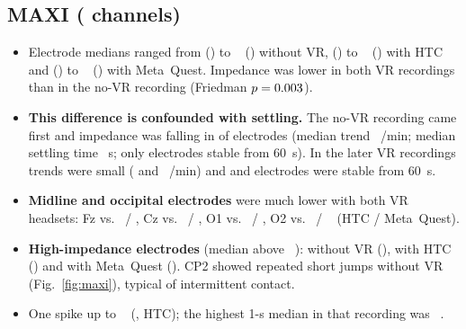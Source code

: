 \documentclass[11pt,a4paper]{article}
\begin{document}
\subsection{MAXI (\impMAXINChannels{} channels)}
\begin{itemize}
  \item Electrode medians ranged from \impMAXIMedMinNoVR{} (\impMAXIMedMinChNoVR) to
    \impMAXIMedMaxNoVR~\impUnit{} (\impMAXIMedMaxChNoVR) without VR,
    \impMAXIMedMinHTC{} (\impMAXIMedMinChHTC) to \impMAXIMedMaxHTC~\impUnit{}
    (\impMAXIMedMaxChHTC) with HTC and \impMAXIMedMinMetaQuest{}
    (\impMAXIMedMinChMetaQuest) to \impMAXIMedMaxMetaQuest~\impUnit{}
    (\impMAXIMedMaxChMetaQuest) with Meta~Quest. Impedance was lower in both VR
    recordings than in the no-VR recording (Friedman \(p = 0.003\)).
  \item \textbf{This difference is confounded with settling.} The no-VR
    recording came first and impedance was falling in
    \impMAXINDecreaseNoVR{} of \impMAXINChannels{} electrodes (median trend
    \impMAXISlopeNoVRWfive~\impUnit/min; median settling time
    \impMAXISettleMedNoVR~s; only \impMAXINSettledSixtyNoVR{} electrodes stable
    from 60~s). In the later VR recordings trends were small
    (\impMAXISlopeHTCWfive{} and \impMAXISlopeMetaQuestWfive~\impUnit/min) and
    \impMAXINSettledSixtyHTC{} and \impMAXINSettledSixtyMetaQuest{} electrodes
    were stable from 60~s.
  \item \textbf{Midline and occipital electrodes} were much lower with both VR
    headsets: Fz \impMAXIMedFzNoVR{} vs.\ \impMAXIMedFzHTC{} /
    \impMAXIMedFzMetaQuest, Cz \impMAXIMedCzNoVR{} vs.\ \impMAXIMedCzHTC{} /
    \impMAXIMedCzMetaQuest, O1 \impMAXIMedOoneNoVR{} vs.\ \impMAXIMedOoneHTC{} /
    \impMAXIMedOoneMetaQuest, O2 \impMAXIMedOtwoNoVR{} vs.\ \impMAXIMedOtwoHTC{} /
    \impMAXIMedOtwoMetaQuest~\impUnit{} (HTC / Meta~Quest).
  \item \textbf{High-impedance electrodes} (median above \impHighZ~\impUnit):
    \impMAXINHighNoVR{} without VR (\impMAXIHighChNoVR), \impMAXINHighHTC{}
    with HTC (\impMAXIHighChHTC) and \impMAXINHighMetaQuest{} with Meta~Quest
    (\impMAXIHighChMetaQuest). CP2 showed repeated short jumps without VR
    (Fig.~\ref{fig:maxi}), typical of intermittent contact.
  \item One spike up to \impMAXIMaxHTC~\impUnit{} (\impMAXIMaxChHTC, HTC); the
    highest 1-s median in that recording was \impMAXISmoothMaxHTCWone~\impUnit.
\end{itemize}
\end{document}
